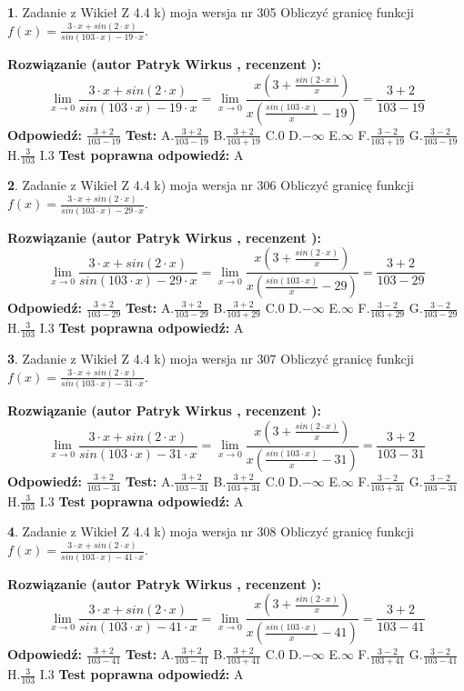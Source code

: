\documentclass[12pt, a4paper]{article}
\theoremstyle{definition} %
\newtheorem{zad}{}
\newcommand{\zadStart}[1]{\begin{zad}#1\newline}
\newcommand{\zadStop}{\end{zad}}
\newcommand{\rozwStart}[2]{\noindent \textbf{Rozwiązanie (autor #1 , recenzent #2): }\newline}
\newcommand{\rozwStop}{\newline}
\newcommand{\odpStart}{\noindent \textbf{Odpowiedź:}\newline}
\newcommand{\odpStop}{\newline}
\newcommand{\testStart}{\noindent \textbf{Test:}\newline}
\newcommand{\testStop}{\newline}
\newcommand{\kluczStart}{\noindent \textbf{Test poprawna odpowiedź:}\newline}
\newcommand{\kluczStop}{\newline}
\begin{document}
\zadStart{Zadanie z Wikieł Z 4.4 k) moja wersja nr 305}
Obliczyć granicę funkcji $f(x)=\frac{3\cdot x +sin(2\cdot x)}{sin(103\cdot x) -19\cdot x}$.
\zadStop
\rozwStart{Patryk Wirkus}{}
$$\lim\limits_{x\to 0}\frac{3\cdot x +sin(2\cdot x)}{sin(103\cdot x) -19\cdot x}
=\lim\limits_{x\to 0}\frac{x(3+\frac{sin(2\cdot x)}{x})}{x(\frac{sin(103\cdot x)}{x}-19)}
=\frac{3+2}{103-19}$$
\rozwStop
\odpStart
$\frac{3+2}{103-19}$
\odpStop
\testStart
A.$\frac{3+2}{103-19}$
B.$\frac{3+2}{103+19}$
C.$0$
D.$-\infty$
E.$\infty$
F.$\frac{3-2}{103+19}$
G.$\frac{3-2}{103-19}$
H.$\frac{3}{103}$
I.$3$
\testStop
\kluczStart
A
\kluczStop



\zadStart{Zadanie z Wikieł Z 4.4 k) moja wersja nr 306}
Obliczyć granicę funkcji $f(x)=\frac{3\cdot x +sin(2\cdot x)}{sin(103\cdot x) -29\cdot x}$.
\zadStop
\rozwStart{Patryk Wirkus}{}
$$\lim\limits_{x\to 0}\frac{3\cdot x +sin(2\cdot x)}{sin(103\cdot x) -29\cdot x}
=\lim\limits_{x\to 0}\frac{x(3+\frac{sin(2\cdot x)}{x})}{x(\frac{sin(103\cdot x)}{x}-29)}
=\frac{3+2}{103-29}$$
\rozwStop
\odpStart
$\frac{3+2}{103-29}$
\odpStop
\testStart
A.$\frac{3+2}{103-29}$
B.$\frac{3+2}{103+29}$
C.$0$
D.$-\infty$
E.$\infty$
F.$\frac{3-2}{103+29}$
G.$\frac{3-2}{103-29}$
H.$\frac{3}{103}$
I.$3$
\testStop
\kluczStart
A
\kluczStop



\zadStart{Zadanie z Wikieł Z 4.4 k) moja wersja nr 307}
Obliczyć granicę funkcji $f(x)=\frac{3\cdot x +sin(2\cdot x)}{sin(103\cdot x) -31\cdot x}$.
\zadStop
\rozwStart{Patryk Wirkus}{}
$$\lim\limits_{x\to 0}\frac{3\cdot x +sin(2\cdot x)}{sin(103\cdot x) -31\cdot x}
=\lim\limits_{x\to 0}\frac{x(3+\frac{sin(2\cdot x)}{x})}{x(\frac{sin(103\cdot x)}{x}-31)}
=\frac{3+2}{103-31}$$
\rozwStop
\odpStart
$\frac{3+2}{103-31}$
\odpStop
\testStart
A.$\frac{3+2}{103-31}$
B.$\frac{3+2}{103+31}$
C.$0$
D.$-\infty$
E.$\infty$
F.$\frac{3-2}{103+31}$
G.$\frac{3-2}{103-31}$
H.$\frac{3}{103}$
I.$3$
\testStop
\kluczStart
A
\kluczStop



\zadStart{Zadanie z Wikieł Z 4.4 k) moja wersja nr 308}
Obliczyć granicę funkcji $f(x)=\frac{3\cdot x +sin(2\cdot x)}{sin(103\cdot x) -41\cdot x}$.
\zadStop
\rozwStart{Patryk Wirkus}{}
$$\lim\limits_{x\to 0}\frac{3\cdot x +sin(2\cdot x)}{sin(103\cdot x) -41\cdot x}
=\lim\limits_{x\to 0}\frac{x(3+\frac{sin(2\cdot x)}{x})}{x(\frac{sin(103\cdot x)}{x}-41)}
=\frac{3+2}{103-41}$$
\rozwStop
\odpStart
$\frac{3+2}{103-41}$
\odpStop
\testStart
A.$\frac{3+2}{103-41}$
B.$\frac{3+2}{103+41}$
C.$0$
D.$-\infty$
E.$\infty$
F.$\frac{3-2}{103+41}$
G.$\frac{3-2}{103-41}$
H.$\frac{3}{103}$
I.$3$
\testStop
\kluczStart
A
\kluczStop
\end{document}
